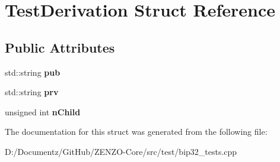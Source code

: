 \hypertarget{struct_test_derivation}{}\section{Test\+Derivation Struct Reference}
\label{struct_test_derivation}
\subsection*{Public Attributes}
\begin{DoxyCompactItemize}
\item 
\mbox{\label{struct_test_derivation_afe34283feddc4ce6a942761a361d31a0}} 
std\+::string {\bfseries pub}
\item 
\mbox{\label{struct_test_derivation_a9789eba10131e5ec5680060c47e3daa7}} 
std\+::string {\bfseries prv}
\item 
\mbox{\label{struct_test_derivation_ac48b24762134f580bc8192337ddbd8eb}} 
unsigned int {\bfseries n\+Child}
\end{DoxyCompactItemize}


The documentation for this struct was generated from the following file\+:\begin{DoxyCompactItemize}
\item 
D\+:/\+Documentz/\+Git\+Hub/\+Z\+E\+N\+Z\+O-\/\+Core/src/test/bip32\+\_\+tests.\+cpp\end{DoxyCompactItemize}
